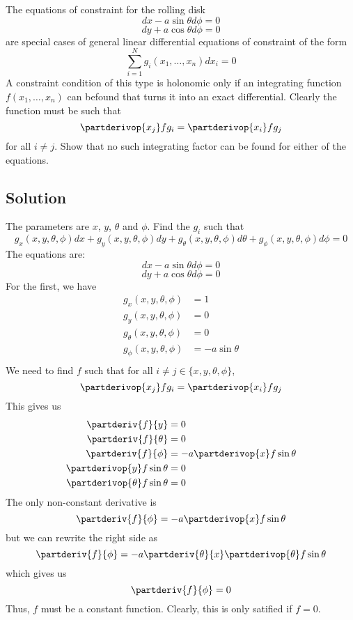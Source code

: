 The equations of constraint for the rolling disk
\[ dx - a\sin\theta d\phi = 0\]
\[ dy + a\cos\theta d\phi = 0\]
are special cases of general linear differential equations of
constraint of the form
\[\sum_{i=1}^N g_i(x_1,\ldots,x_n)dx_i = 0\]
A constraint condition of this type is holonomic only if an
integrating function $f(x_1,\ldots,x_n)$ can befound that turns it
into an exact differential.  Clearly the function must be such that
\[\partderivop{x_j}fg_i = \partderivop{x_i}fg_j\]
for all $i \neq j$.  Show that no such integrating factor can be found
for either of the equations.

\subsection*{Solution}

The parameters are $x$, $y$, $\theta$ and $\phi$.  Find the $g_i$ such
that
\[
g_x(x, y, \theta, \phi)dx
+g_y(x, y, \theta, \phi)dy
+g_{\theta}(x, y, \theta, \phi)d\theta
+g_{\phi}(x, y, \theta, \phi)d\phi
=
0
\]
The equations are:
\[ dx - a\sin\theta d\phi = 0\]
\[ dy + a\cos\theta d\phi = 0\]
For the first, we have
\begin{align*}
g_x(x, y, \theta, \phi) &= 1 \\
g_y(x, y, \theta, \phi) &= 0 \\
g_{\theta}(x, y, \theta, \phi) &= 0 \\
g_{\phi}(x, y, \theta, \phi) &= -a\sin\theta \\
\end{align*}
We need to find $f$ such that for all $i \neq j \in \{x, y, \theta,
\phi\}$,
\[\partderivop{x_j}fg_i = \partderivop{x_i}fg_j\]
This gives us
\begin{align*}
\partderiv{f}{y} &= 0 \\
\partderiv{f}{\theta} &= 0 \\
\partderiv{f}{\phi} &= -a\partderivop{x}f\sin\theta \\
\partderivop{y}f\sin\theta &= 0 \\
\partderivop{\theta}f\sin\theta &= 0
\end{align*}
The only non-constant derivative is
\[\partderiv{f}{\phi} = -a\partderivop{x}f\sin\theta\]
but we can rewrite the right side as
\[
\partderiv{f}{\phi}
=
-a\partderiv{\theta}{x}
\partderivop{\theta}f\sin\theta\]
which gives us
\[\partderiv{f}{\phi} = 0\]
Thus, $f$ must be a constant function.  Clearly, this is only satified
if $f = 0$.

